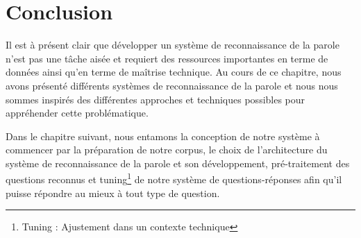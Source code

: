 


\section{Conclusion}

Il est à présent clair que développer un système de reconnaissance de la parole n'est pas une tâche aisée et requiert des ressources importantes en terme de données ainsi qu'en terme de maîtrise technique.
Au cours de ce chapitre, nous avons présenté différents systèmes de reconnaissance de la parole et nous nous sommes inspirés des différentes approches et techniques possibles pour appréhender cette problématique.

Dans le chapitre suivant, nous entamons la conception de notre système à commencer par la préparation de notre corpus, le choix de l'architecture du système de reconnaissance de la parole et son développement, pré-traitement des questions reconnus et tuning\footnote{Tuning : Ajustement dans un contexte technique} de notre système de questions-réponses afin qu'il puisse répondre au mieux à tout type de question.